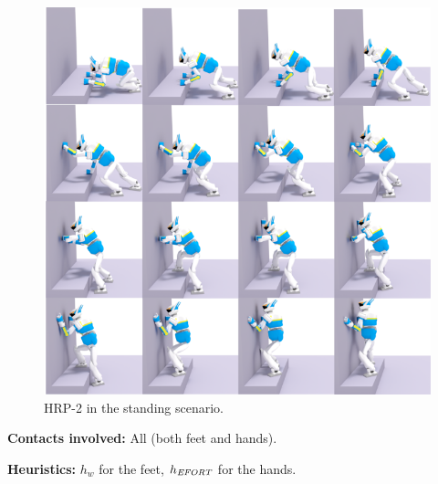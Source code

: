 \documentclass[journal]{IEEEtran}
\newcommand{\gls}[1]{\textit{#1}}
\begin{document}
\begin{figure}
  \centering
  \includegraphics[width=1\linewidth]{figures/standing}
  \caption{
           HRP-2 in the standing scenario. }
		   \label{fig:standing}
\end{figure}


\noindent\textbf{Contacts involved:} All (both feet and hands).

\noindent\textbf{Heuristics:} $h_w$ for the feet, $h_{\textrm{\it EFORT}}$  for the hands.

\end{document}
